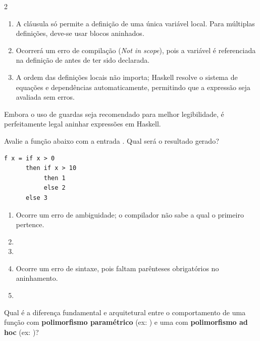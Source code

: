 \documentclass[a4paper,10pt,brazil]{article}
\begin{document}
\begin{multicols}{2}
\begin{enumerate}
  \item A cláusula  só permite a definição de uma única variável local. Para múltiplas definições, deve-se usar blocos  aninhados.

  \item Ocorrerá um erro de compilação (\emph{Not in scope}), pois a variável  é referenciada na definição de  antes de ter sido declarada.

  \item A ordem das definições locais não importa; Haskell resolve o sistema de equações e dependências automaticamente, permitindo que a expressão seja avaliada sem erros.


\end{enumerate}

Embora o uso de guardas seja recomendado para melhor legibilidade, é perfeitamente legal aninhar expressões  em Haskell. 

Avalie a função abaixo com a entrada . Qual será o resultado gerado?
\begin{verbatim}
f x = if x > 0
      then if x > 10
           then 1
           else 2
      else 3
\end{verbatim}

\begin{enumerate}
  \item Ocorre um erro de ambiguidade; o compilador não sabe a qual  o primeiro  pertence.

  \item {}

  \item {}

  \item Ocorre um erro de sintaxe, pois faltam parênteses obrigatórios no aninhamento.

  \item {}


\end{enumerate}

Qual é a diferença fundamental e arquitetural entre o comportamento de uma função com \textbf{polimorfismo paramétrico} (ex: ) e uma com \textbf{polimorfismo ad hoc} (ex: )?


\end{multicols}
\end{document}
